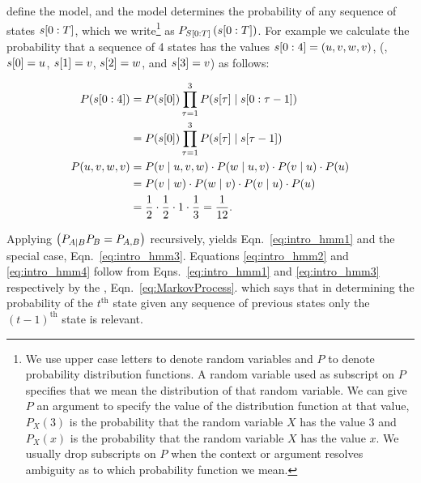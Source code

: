 define the model, and the model determines the probability of any
sequence of states $s[0:T]$, which we write\footnote{We use
  upper case letters to denote random variables and $P$ to denote
  probability distribution functions.  A random variable used as
  subscript on $P$ specifies that we mean the distribution of that
  random variable.  We can give $P$ an argument to specify the value
  of the distribution function at that value, \eg $P_X(3)$ is the
  probability that the random variable $X$ has the value 3 and
  $P_X(x)$ is the probability that the random variable $X$ has the
  value $x$.  We usually drop subscripts on $P$ when the context or
  argument resolves ambiguity as to which probability function we
  mean.} as $P_{S[0:T]}\left( s[0:T] \right)$.  For
example we calculate the probability that a sequence of 4 states has
the values $s[0:4] = (u,v,w,v)$, (\ie, ${s}{[0]} = u$,
${s}{[1]} = v$, ${s}{[2]} = w$, and ${s}{[3]} = v$) as follows:

\begin{align}
  \label{eq:intro_hmm1}
  P(\ts{s}{0}{4}) &= P(\ti{s}{0}) \prod_{\tau=1}^3 %
                     P(\ti{s}{\tau}\given \ts{s}{0}{\tau-1})\\
  \label{eq:intro_hmm2}
                  &= P(\ti{s}{0}) \prod_{\tau=1}^3 %
                     P(\ti{s}{\tau}\given \ti{s}{\tau-1}) \\
  \label{eq:intro_hmm3}
  P(u,v,w,v)      &= P(v\given u,v,w) \cdot P(w\given u,v) \cdot  P(v\given u) \cdot P(u)\\
  \label{eq:intro_hmm4}
        &= P(v\given w) \cdot P(w\given v) \cdot  P(v\given u) \cdot P(u)\\
  \label{eq:intro_hmm5}
        &= \frac{1}{2} \cdot \frac{1}{2} \cdot 1 %
                     \cdot \frac{1}{3} = \frac{1}{12}.
\end{align}

Applying  $\left( P_{A\mid B} P_B = P_{A,B} \right)$
recursively, yields Eqn.~\eqref{eq:intro_hmm1} and the special case,
Eqn.~\eqref{eq:intro_hmm3}.  Equations \eqref{eq:intro_hmm2} and
\eqref{eq:intro_hmm4} follow from Eqns.~\eqref{eq:intro_hmm1} and
\eqref{eq:intro_hmm3} respectively by the %
\emph{}, Eqn.~\eqref{eq:MarkovProcess}.
which says that in determining the probability of the $t^\text{th}$
state given any sequence of previous states only the $(t-1)^\text{th}$
state is relevant. %

